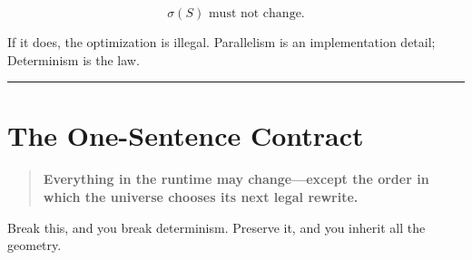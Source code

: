 \[
\sigma(S) \text{ must not change.}
\]

If it does, the optimization is illegal. Parallelism is an implementation detail; Determinism is the law.

\begin{center}
\rule{0.7\linewidth}{0.7pt}
\end{center}

\section*{The One-Sentence Contract}

\begin{quote}
\Large\textbf{
Everything in the runtime may change—except the order in which the universe chooses its next legal rewrite.
}
\end{quote}

Break this, and you break determinism. Preserve it, and you inherit all the geometry.
